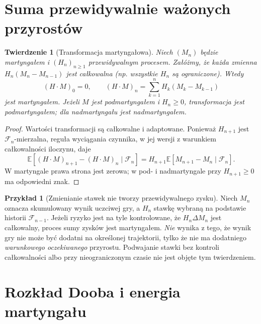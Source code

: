 \documentclass[11pt,a4paper,oneside]{report}
\numberwithin{equation}{chapter}
\theoremstyle{plain}
\newtheorem{twierdzenie}{Twierdzenie}[chapter]
\theoremstyle{definition}
\newtheorem{przyklad}{Przykład}[chapter]
\theoremstyle{remark}
\newcommand{\E}{\mathbb{E}}
\begin{document}
\section{Suma przewidywalnie ważonych przyrostów}

\begin{twierdzenie}[Transformacja martyngałowa]
Niech $(M_n)$ będzie martyngałem i
$(H_n)_{n\geq1}$ przewidywalnym procesem.
Załóżmy, że każda zmienna
$H_n(M_n-M_{n-1})$ jest całkowalna
(np. wszystkie $H_n$ są ograniczone).
Wtedy
\[
(H\cdot M)_0=0,\qquad
(H\cdot M)_n=\sum_{k=1}^nH_k(M_k-M_{k-1})
\]
jest martyngałem. Jeżeli $M$ jest
podmartyngałem i $H_n\geq0$, transformacja
jest podmartyngałem; dla nadmartyngału
jest nadmartyngałem.
\end{twierdzenie}
\begin{proof}
Wartości transformacji są całkowalne i adaptowane.
Ponieważ $H_{n+1}$ jest $\mathcal F_n$-mierzalna,
reguła wyciągania czynnika, w jej wersji
z warunkiem całkowalności iloczynu, daje
\[
\E[(H\cdot M)_{n+1}-(H\cdot M)_n
\mid\mathcal F_n]
=H_{n+1}\E[M_{n+1}-M_n\mid\mathcal F_n].
\]
W martyngale prawa strona jest zerowa; w
pod- i nadmartyngale przy $H_{n+1}\geq0$
ma odpowiedni znak.
\end{proof}

\begin{przyklad}[Zmienianie stawek nie tworzy przewidywalnego zysku]
Niech $M_n$ oznacza skumulowany wynik uczciwej gry,
a $H_n$ stawkę wybraną na podstawie historii
$\mathcal F_{n-1}$. Jeżeli ryzyko jest na tyle
kontrolowane, że $H_n\Delta M_n$ jest całkowalny,
proces sumy zysków jest martyngałem.
\emph{Nie} wynika z tego, że wynik gry nie może
być dodatni na określonej trajektorii, tylko że
nie ma dodatniego \emph{warunkowego oczekiwanego}
przyrostu. Podwajanie stawki bez kontroli
całkowalności albo przy nieograniczonym czasie
nie jest objęte tym twierdzeniem.
\end{przyklad}

\section{Rozkład Dooba i energia martyngału}
\end{document}
